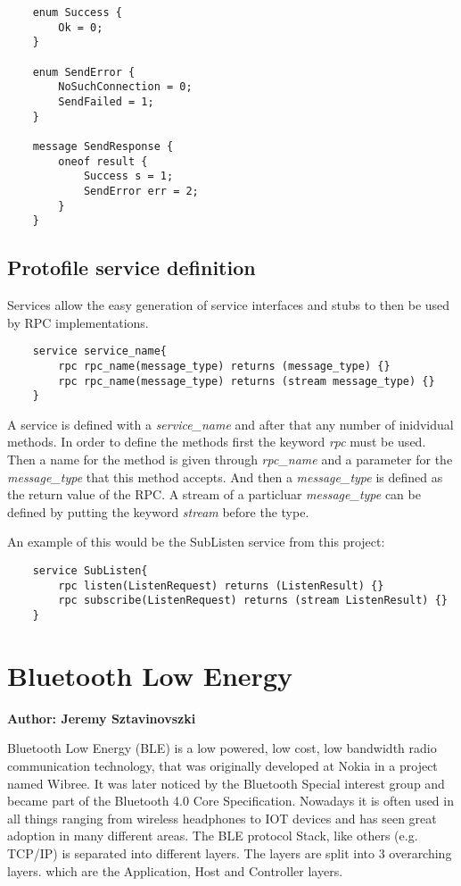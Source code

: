 \begin{verbatim}
    enum Success {
        Ok = 0;
    }

    enum SendError {
        NoSuchConnection = 0;
        SendFailed = 1;
    }

    message SendResponse {
        oneof result {
            Success s = 1;
            SendError err = 2;
        }
    }
\end{verbatim}

\subsection{Protofile service definition}

Services allow the easy generation of service interfaces and stubs to then be used by RPC implementations.

\begin{verbatim}
    service service_name{
        rpc rpc_name(message_type) returns (message_type) {}
        rpc rpc_name(message_type) returns (stream message_type) {}
    }
\end{verbatim}

A service is defined with a \textit{service\_name} and after that any number of inidvidual methods. In order to define the methods first the keyword \textit{rpc} must be used.
Then a name for the method is given through \textit{rpc\_name} and a parameter for the \textit{message\_type} that this method accepts. And then a \textit{message\_type}
is defined as the return value of the RPC. A stream of a particluar \textit{message\_type} can be defined by putting the keyword \textit{stream} before the type.

An example of this would be the SubListen service from this project:

\begin{verbatim}
    service SubListen{
        rpc listen(ListenRequest) returns (ListenResult) {}
        rpc subscribe(ListenRequest) returns (stream ListenResult) {}
    }
\end{verbatim}

\section{Bluetooth Low Energy}
\textbf{Author: Jeremy Sztavinovszki}

Bluetooth Low Energy (BLE) is a low powered, low cost, low bandwidth radio communication technology, that was originally developed at Nokia in a project named Wibree. It was later noticed by the Bluetooth Special interest group and became part of the Bluetooth 4.0 Core Specification. Nowadays it is often used in all things ranging from wireless headphones to IOT devices and has seen great adoption in many different areas. The BLE protocol Stack, like others (e.g. TCP/IP) is separated into different layers. The layers are split into 3 overarching layers. which are the Application, Host and Controller layers.

